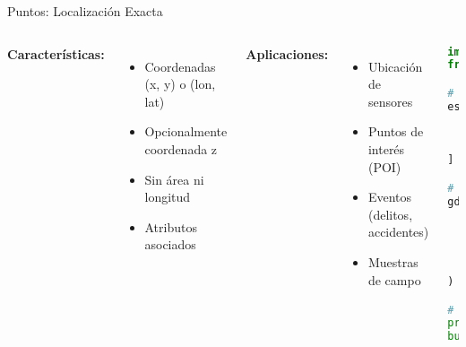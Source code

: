 \documentclass[10pt]{beamer}
\begin{document}
\begin{frame}[fragile]{Puntos: Localización Exacta}
    \begin{columns}
        \textbf{Características:}
        \begin{itemize}
            \item Coordenadas (x, y) o (lon, lat)
            \item Opcionalmente coordenada z
            \item Sin área ni longitud
            \item Atributos asociados
        \end{itemize}
        
        \textbf{Aplicaciones:}
        \begin{itemize}
            \item Ubicación de sensores
            \item Puntos de interés (POI)
            \item Eventos (delitos, accidentes)
            \item Muestras de campo
        \end{itemize}
        
        \begin{lstlisting}[language=Python, caption=Puntos en GeoPandas]
import geopandas as gpd
from shapely.geometry import Point

# Crear puntos de estaciones
estaciones = [
    Point(-70.6693, -33.4489),  # Santiago
    Point(-70.6483, -33.4372),  # La Moneda
    Point(-70.6506, -33.4183),  # Santa Ana
]

# Crear GeoDataFrame
gdf = gpd.GeoDataFrame(
    {'nombre': ['Santiago', 'La Moneda', 
                'Santa Ana'],
     'linea': [1, 1, 2]},
    geometry=estaciones,
    crs='EPSG:4326'
)

# Operaciones
print(gdf.distance(gdf.iloc[0].geometry))
buffer = gdf.buffer(0.001)  # 100m aprox
        \end{lstlisting}
    \end{columns}
\end{frame}
\end{document}
